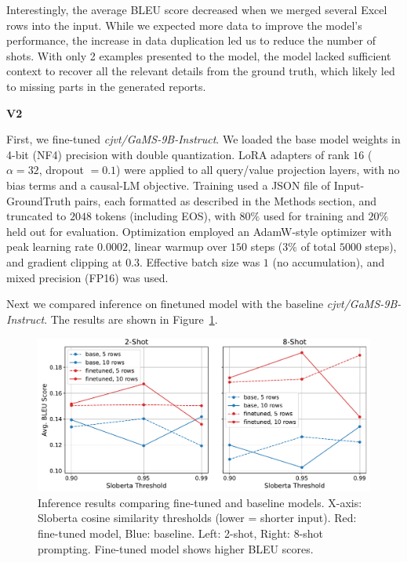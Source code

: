 \documentclass[fleqn,moreauthors,10pt]{ds_report}
\begin{document}
Interestingly, the average BLEU score decreased when we merged several Excel rows into the input. While we expected more data to improve the model's performance, the increase in data duplication led us to reduce the number of shots. With only 2 examples presented to the model, the model lacked sufficient context to recover all the relevant details from the ground truth, which likely led to missing parts in the generated reports.

\vspace{1em} %
\noindent \textbf{V2}
\vspace{0.5em} %

First, we fine-tuned \textit{cjvt/GaMS-9B-Instruct}. We loaded the base model weights in 4-bit (NF4) precision with
double quantization. LoRA adapters of rank $16$ ($\alpha = 32$, dropout $=0.1$) were applied to all query/value
projection layers, with no bias terms and a causal-LM objective.
Training used a JSON file of Input-GroundTruth pairs, each formatted as described in the Methods section, and
truncated to $2048$ tokens (including EOS), with $80\%$ used for training and $20\%$ held out for evaluation.
Optimization employed an AdamW-style optimizer with peak learning rate $0.0002$, linear warmup over $150$ steps
(3\% of total $5000$ steps), and gradient clipping at $0.3$. Effective batch size was $1$ (no accumulation), and
mixed precision (FP16) was used.

Next we compared inference on finetuned model with the baseline \textit{cjvt/GaMS-9B-Instruct}. The results are
shown in Figure~\ref{fig:inf_res}.

\begin{figure}[ht]
    \centering
    \includegraphics[width=\columnwidth]{fig/infer_res.pdf}
    \caption{Inference results comparing fine-tuned and baseline models.
    X-axis: Sloberta cosine similarity thresholds (lower = shorter input).
    Red: fine-tuned model, Blue: baseline.
    Left: 2-shot, Right: 8-shot prompting.
    Fine-tuned model shows higher BLEU scores.}
    \label{fig:inf_res}
\end{figure}
\end{document}
